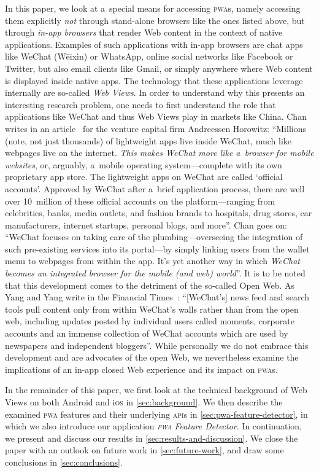 \documentclass[sigconf]{acmart}
\begin{document}
In this paper, we look at a~special means for accessing \textsc{pwa}s,
namely accessing them explicitly \emph{not} through stand-alone browsers
like the ones listed above,
but through \emph{in-app browsers} that render Web content in the context of native applications.
Examples of such applications with in-app browsers are chat apps like WeChat (Wēixìn) or WhatsApp,
online social networks like Facebook or Twitter, but also email clients like Gmail,
or simply anywhere where Web content is displayed inside native apps.
The technology that these applications leverage internally are so-called \emph{Web Views}.
In order to understand why this presents an interesting research problem,
one needs to first understand the role that applications like WeChat
and thus Web Views play in markets like China.
Chan writes in an article~\cite{chan2015wechat} for the venture capital firm Andreessen Horowitz:
``Millions (note, not just thousands) of lightweight apps live inside WeChat,
much like webpages live on the internet.
\emph{This makes WeChat more like a~browser for mobile websites}, or, arguably,
a~mobile operating system---complete with its own proprietary app store.
The lightweight apps on WeChat are called `official accounts'.
Approved by WeChat after a~brief application process,
there are well over 10~million of these official accounts on the platform---ranging
from celebrities, banks, media outlets, and fashion brands to hospitals, drug stores,
car manufacturers, internet startups, personal blogs, and more''.
Chan goes on: ``WeChat focuses on taking care of the plumbing---overseeing
the integration of such pre-existing services into its portal---by
simply linking users from the wallet menu to webpages from within the app.
It's yet another way in which \emph{WeChat
becomes an integrated browser for the mobile (and web) world}''.
It is to be noted that this development comes to the detriment of the so-called Open Web.
As Yang and Yang write in the Financial Times~\cite{yang2017tencent}:
``[WeChat's] news feed and search tools pull content only from within WeChat's walls
rather than from the open web, including updates posted by individual users called moments,
corporate accounts and an immense collection of WeChat accounts
which are used by newspapers and independent bloggers''.
While personally we do not embrace this development
and are advocates of the open Web,
we nevertheless examine the implications of an in-app closed Web experience
and its impact on \textsc{pwa}s. 

In the remainder of this paper, we first look at the technical background of Web Views
on both Android and i\textsc{os} in \autoref{sec:background}.
We then describe the examined \textsc{pwa} features and their underlying \textsc{api}s
in \autoref{sec:pwa-feature-detector}, in which we also introduce
our application \emph{\textsc{pwa} Feature Detector}.
In continuation, we present and discuss our results in \autoref{sec:results-and-discussion}.
We close the paper with an outlook on future work in \autoref{sec:future-work},
and draw some conclusions in \autoref{sec:conclusions}.
\end{document}
